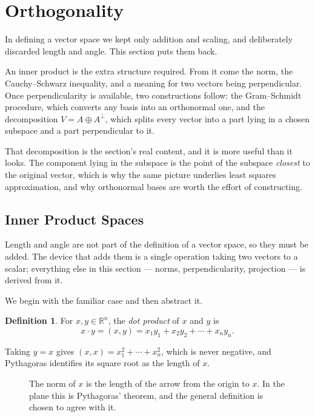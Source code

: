 \documentclass[11pt,a4paper]{article}
\theoremstyle{definition}
\newtheorem{defn}[thm]{Definition}
\begin{document}
\pagebreak
\section{Orthogonality}
In defining a vector space we kept only addition and scaling, and deliberately
discarded length and angle. This section puts them back.

An inner product is the extra structure required. From it come the norm, the
Cauchy--Schwarz inequality, and a meaning for two vectors being perpendicular.
Once perpendicularity is available, two constructions follow: the Gram--Schmidt
procedure, which converts any basis into an orthonormal one, and the
decomposition $V=A\oplus A^{\perp}$, which splits every vector into a part
lying in a chosen subspace and a part perpendicular to it.

That decomposition is the section's real content, and it is more useful than it
looks. The component lying in the subspace is the point of the subspace
\emph{closest} to the original vector, which is why the same picture underlies
least squares approximation, and why orthonormal bases are worth the effort of
constructing.


\subsection{Inner Product Spaces}
Length and angle are not part of the definition of a vector space, so they must
be added. The device that adds them is a single operation taking two vectors to
a scalar; everything else in this section --- norms, perpendicularity,
projection --- is derived from it.

We begin with the familiar case and then abstract it.

\begin{defn}
For $x,y\in \mathbb{R}^n$, the \emph{dot product} of $x$ and $y$ is
$$x\cdot y=(x,y)=x_1y_1+x_2y_2+\cdots+x_ny_n.$$
\end{defn}

Taking $y=x$ gives $(x,x)=x_1^2+\cdots+x_n^2$, which is never negative, and
Pythagoras identifies its square root as the length of $x$.

\begin{figure}[H]
\centering
{}
\caption{The norm of $x$ is the length of the arrow from the origin to $x$. In
the plane this is Pythagoras' theorem, and the general definition is chosen to
agree with it.}
\end{figure}
\end{document}
